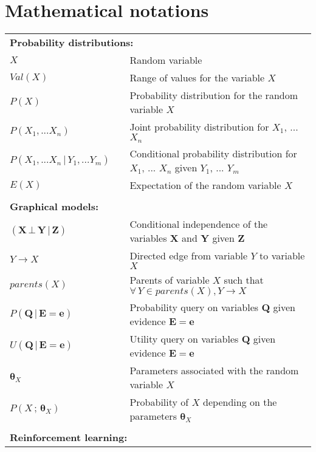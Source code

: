 
\chapter*{Mathematical notations}
\thispagestyle{empty}

\begin{longtable}{lp{5mm}p{11cm}}
\multicolumn{3}{l}{\textbf{Probability distributions:}} \vspace{2mm} \\
$X$ && Random variable \\
$Val(X)$ && Range of values for the variable $X$ \\
$P(X)$ && Probability distribution for the random variable $X$ \\
$P(X_1, ...X_n)$ && Joint probability distribution for $X_1$, ... $X_n$ \\
$P(X_1,...X_n \, | \, Y_1, ... Y_m)$ && Conditional probability distribution for $X_1$, ... $X_n$ given $Y_1$, ... $Y_m$  \\ 
$E(X)$ && Expectation of the random variable $X$ \\
&&  \vspace{0mm} \\
\multicolumn{3}{l}{\textbf{Graphical models:}} \vspace{2mm} \\
$(\mathbf{X} \, \bot \, \mathbf{Y} \, | \, \mathbf{Z})$ && Conditional independence of the variables $\mathbf{X} $ and $\mathbf{Y}$ given $\mathbf{Z}$ \\
$Y \rightarrow X$ && Directed edge from variable $Y$ to variable $X$ \\
$parents(X)$ && Parents of variable $X$ such that $\forall\, Y\!\in\!parents(X), Y \rightarrow X$ \\
 $P(\mathbf{Q}  \, | \,  \mathbf{E}\!=\!\mathbf{e})$ && Probability query on variables $\mathbf{Q}$ given evidence $\mathbf{E}\!=\!\mathbf{e}$ \\ 
 $U(\mathbf{Q}  \, | \,  \mathbf{E}\!=\!\mathbf{e})$ && Utility query on variables $\mathbf{Q}$ given evidence $\mathbf{E}\!=\!\mathbf{e}$ \\ 
 $\boldsymbol\theta_{X}$ && Parameters associated with the random variable $X$ \\ 
 $P(X \, ; \, \boldsymbol\theta_{X})$ && Probability of $X$ depending on the parameters $\boldsymbol\theta_{X}$ \\ 
 &&  \vspace{0mm} \\
\multicolumn{3}{l}{\textbf{Reinforcement learning:}} \vspace{2mm} \\

\end{longtable}
